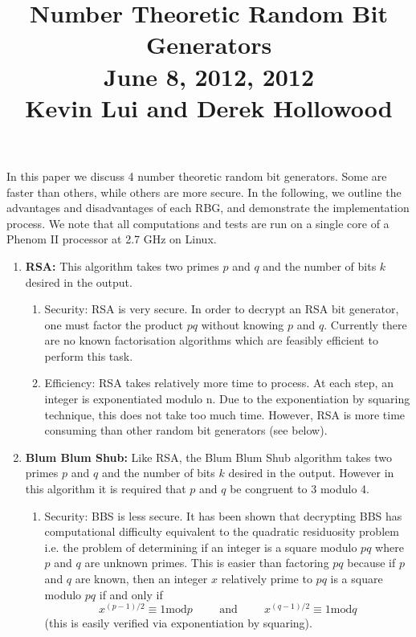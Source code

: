 \documentclass[12pt,reqno]{amsart}
\begin{document}
\title[]{Number Theoretic Random Bit Generators\\June 8, 2012, 2012\\Kevin Lui and Derek Hollowood}
\maketitle
\large
In this paper we discuss 4 number theoretic random bit generators. Some are
faster than others, while others are more secure. In the following, we outline
the advantages and disadvantages of each RBG, and demonstrate the
implementation process. We note that all computations and tests are run on a
single core of a Phenom II processor at 2.7 GHz on Linux.

\begin{enumerate}

\item
{\bf RSA:} This algorithm takes two primes $p$ and $q$ and the number of bits $k$ desired in the output.

\begin{enumerate}

\item
Security: RSA is very secure. In order to decrypt an RSA bit generator, one must factor the product $p q$ without knowing $p$ and $q$. Currently there are no known factorisation algorithms which are feasibly efficient to perform this task.

\item
Efficiency: RSA takes relatively more time to process. At each step, an integer is exponentiated modulo n. Due to the exponentiation by squaring technique, this does not take too much time. However, RSA is more time consuming than other random bit generators (see below).

\end{enumerate}

\item
{\bf Blum Blum Shub:} Like RSA, the Blum Blum Shub algorithm takes two primes $p$ and $q$ and the number of bits $k$ desired in the output. However in this algorithm it is required that $p$ and $q$ be congruent to 3 modulo 4.

\begin{enumerate}

\item
Security: BBS is less secure. It has been shown that decrypting BBS has computational difficulty equivalent to the quadratic residuosity problem i.e. the problem of determining if an integer is a square modulo $p q$ where $p$ and $q$ are unknown primes. This is easier than factoring $pq$ because if $p$ and $q$ are known, then an integer $x$ relatively prime to $pq$ is a square modulo $pq$ if and only if
\[
x^{(p-1)/2} \equiv 1 \text{mod} p \hspace{1cm} \text{and} \hspace{1cm} x^{(q-1)/2} \equiv 1 \text{mod} q
\]
(this is easily verified via exponentiation by squaring).


\end{enumerate}
\end{enumerate}
\end{document}
